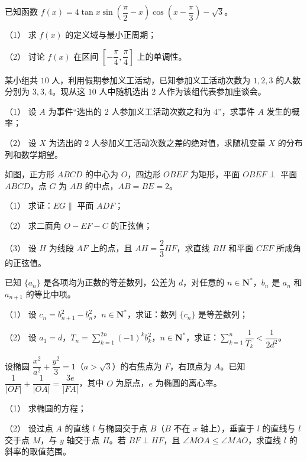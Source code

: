 \begin{question}
已知函数 \(f(x)=4\tan x\sin\left(\dfrac{\pi}{2}-x\right)\cos\left(x-\dfrac{\pi}{3}\right)-\sqrt{3}\)。

（1） 求 \(f(x)\) 的定义域与最小正周期；

（2） 讨论 \(f(x)\) 在区间 \(\left[-\dfrac{\pi}{4},\dfrac{\pi}{4}\right]\) 上的单调性。

\end{question}
\begin{question}
某小组共 \(10\) 人，利用假期参加义工活动，已知参加义工活动次数为 \(1,2,3\) 的人数分别为 \(3,3,4\)。现从这 \(10\) 人中随机选出 \(2\) 人作为该组代表参加座谈会。

（1） 设 \(A\) 为事件“选出的 \(2\) 人参加义工活动次数之和为 \(4\)”，求事件 \(A\) 发生的概率；

（2） 设 \(X\) 为选出的 \(2\) 人参加义工活动次数之差的绝对值，求随机变量 \(X\) 的分布列和数学期望。

\Needspace{0.4\textheight}
\end{question}
\begin{question}
如图，正方形 \(ABCD\) 的中心为 \(O\)，四边形 \(OBEF\) 为矩形，平面 \(OBEF\perp\) 平面 \(ABCD\)，点 \(G\) 为 \(AB\) 的中点，\(AB=BE=2\)。
\nopagebreak[4]
\begin{center}\end{center}
\nopagebreak[4]
（1） 求证：\(EG\parallel\) 平面 \(ADF\)；

（2） 求二面角 \(O-EF-C\) 的正弦值；

（3） 设 \(H\) 为线段 \(AF\) 上的点，且 \(AH=\dfrac{2}{3}HF\)，求直线 \(BH\) 和平面 \(CEF\) 所成角的正弦值。

\Needspace{0.48\textheight}

\end{question}
\begin{question}
已知 \(\{a_{n}\}\) 是各项均为正数的等差数列，公差为 \(d\)，对任意的 \(n\in\mathbf{N}^{*}\)，\(b_{n}\) 是 \(a_{n}\) 和 \(a_{n+1}\) 的等比中项。

（1） 设 \(c_{n}=b_{n+1}^{2}-b_{n}^{2}\)，\(n\in\mathbf{N}^{*}\)，求证：数列 \(\{c_{n}\}\) 是等差数列；

（2） 设 \(a_{1}=d\)，\(T_{n}=\displaystyle\sum_{k=1}^{2n}(-1)^{k}b_{k}^{2}\)，\(n\in\mathbf{N}^{*}\)，求证：\(\displaystyle\sum_{k=1}^{n}\dfrac{1}{T_{k}}<\dfrac{1}{2d^{2}}\)。

\end{question}
\begin{question}
设椭圆 \(\dfrac{x^{2}}{a^{2}}+\dfrac{y^{2}}{3}=1\)（\(a>\sqrt{3}\)）的右焦点为 \(F\)，右顶点为 \(A\)。已知 \(\dfrac{1}{|OF|}+\dfrac{1}{|OA|}=\dfrac{3e}{|FA|}\)，其中 \(O\) 为原点，\(e\) 为椭圆的离心率。

（1） 求椭圆的方程；

（2） 设过点 \(A\) 的直线 \(l\) 与椭圆交于点 \(B\)（\(B\) 不在 \(x\) 轴上），垂直于 \(l\) 的直线与 \(l\) 交于点 \(M\)，与 \(y\) 轴交于点 \(H\)。若 \(BF\perp HF\)，且 \(\angle MOA\leqslant\angle MAO\)，求直线 \(l\) 的斜率的取值范围。

\end{question}
